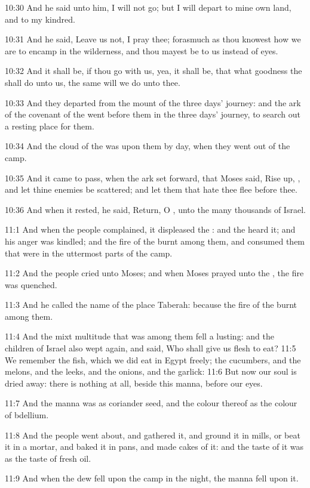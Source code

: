 10:30 And he said unto him, I will not go; but I will depart to mine
own land, and to my kindred.

10:31 And he said, Leave us not, I pray thee; forasmuch as thou
knowest how we are to encamp in the wilderness, and thou mayest be to
us instead of eyes.

10:32 And it shall be, if thou go with us, yea, it shall be, that what
goodness the \LORD shall do unto us, the same will we do unto thee.

10:33 And they departed from the mount of the \LORD three days'
journey: and the ark of the covenant of the \LORD went before them in
the three days' journey, to search out a resting place for them.

10:34 And the cloud of the \LORD was upon them by day, when they went
out of the camp.

10:35 And it came to pass, when the ark set forward, that Moses said,
Rise up, \LORD, and let thine enemies be scattered; and let them that
hate thee flee before thee.

10:36 And when it rested, he said, Return, O \LORD, unto the many
thousands of Israel.

11:1 And when the people complained, it displeased the \LORD: and the
\LORD heard it; and his anger was kindled; and the fire of the \LORD
burnt among them, and consumed them that were in the uttermost parts
of the camp.

11:2 And the people cried unto Moses; and when Moses prayed unto the
\LORD, the fire was quenched.

11:3 And he called the name of the place Taberah: because the fire of
the \LORD burnt among them.

11:4 And the mixt multitude that was among them fell a lusting: and
the children of Israel also wept again, and said, Who shall give us
flesh to eat?  11:5 We remember the fish, which we did eat in Egypt
freely; the cucumbers, and the melons, and the leeks, and the onions,
and the garlick: 11:6 But now our soul is dried away: there is nothing
at all, beside this manna, before our eyes.

11:7 And the manna was as coriander seed, and the colour thereof as
the colour of bdellium.

11:8 And the people went about, and gathered it, and ground it in
mills, or beat it in a mortar, and baked it in pans, and made cakes of
it: and the taste of it was as the taste of fresh oil.

11:9 And when the dew fell upon the camp in the night, the manna fell
upon it.

